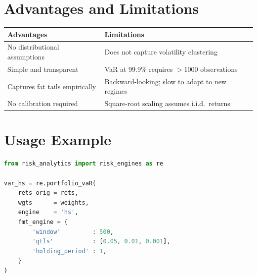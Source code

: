 \documentclass[11pt, a4paper]{article}
\begin{document}
\section{Advantages and Limitations}

\begin{tabular}{p{6cm} p{8cm}}
\toprule
Advantages & Limitations \\
\midrule
No distributional assumptions & Does not capture volatility clustering \\
Simple and transparent & VaR at 99.9\% requires $>1000$ observations \\
Captures fat tails empirically & Backward-looking; slow to adapt to new regimes \\
No calibration required & Square-root scaling assumes i.i.d.\ returns \\
\bottomrule
\end{tabular}

\section{Usage Example}

\begin{lstlisting}[language=Python]
from risk_analytics import risk_engines as re

var_hs = re.portfolio_vaR(
    rets_orig = rets,
    wgts      = weights,
    engine    = 'hs',
    fmt_engine = {
        'window'         : 500,
        'qtls'           : [0.05, 0.01, 0.001],
        'holding_period' : 1,
    }
)
\end{lstlisting}
\end{document}

